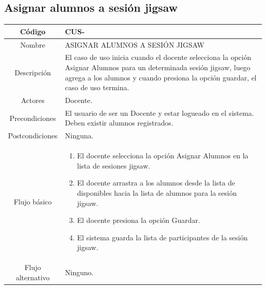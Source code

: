 \subsection{Asignar alumnos a sesión jigsaw}
\begin{longtable}{|c|L{10cm}|}
	\toprule[0.8mm]
	Código &  CUS-\casodeuso\\  \midrule
	Nombre &  ASIGNAR ALUMNOS A SESIÓN JIGSAW\\  \midrule
	Descripción &  El caso de uso inicia cuando el docente selecciona la opción Asignar Alumnos para un determinada sesión jigsaw, luego agrega a los alumnos y cuando presiona la opción guardar, el caso de uso termina.\\  \midrule
	Actores &  Docente.\\  \midrule
	Precondiciones &  El usuario de ser un Docente y estar logueado en el sistema. Deben existir alumnos registrados.\\  \midrule
	Postcondiciones &  Ninguna.\\  \midrule
	Flujo básico &    \begin{enumerate}
		\item El docente selecciona la opción Asignar Alumnos en la lista de sesiones jigsaw.
		\item El docente arrastra a los alumnos desde la lista de disponibles hacia la lista de alumnos para la sesión jigsaw.
		\item El docente presiona la opción Guardar.
		\item El sistema guarda la lista de participantes de la sesión jigsaw.
	\end{enumerate}  \\ \midrule
	Flujo alternativo & Ninguno. \\  \bottomrule[0.8mm]
\end{longtable}
\clearpage
